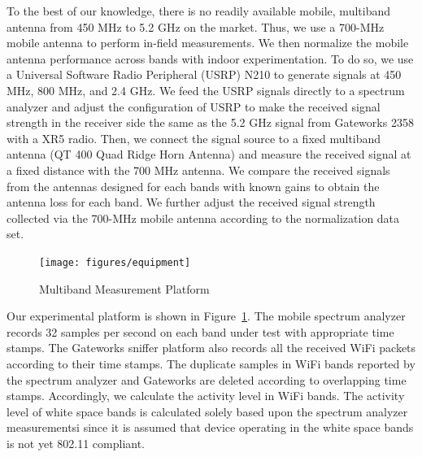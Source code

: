To the best of our knowledge, there is no readily available mobile, multiband antenna from 450 MHz to 5.2 
GHz on the market. Thus, we use a 700-MHz mobile antenna to perform in-field measurements. We then 
normalize the mobile antenna performance across bands with indoor experimentation. To do so, we use a 
Universal Software Radio Peripheral (USRP) N210 to generate signals at 450 MHz, 800 MHz, and 2.4 GHz. We 
feed the USRP signals directly to a spectrum analyzer and adjust the configuration of USRP to make the 
received signal strength in the receiver side the same as the 5.2 GHz signal from Gateworks 2358 with 
a XR5 radio. 
Then, we connect the signal source to a fixed multiband antenna (QT 400 Quad Ridge Horn Antenna) and 
measure the received signal at a fixed distance with the 700 MHz antenna. We compare the received 
signals from the antennas designed for each bands with known gains to obtain the antenna loss for 
each band. We further adjust the received signal strength collected via the 700-MHz mobile antenna 
according to the normalization data set.

  \begin{figure}
  \centering
  \texttt{[image: figures/equipment]}
  \vspace{-0.1in}
  \caption{Multiband Measurement Platform}
  \label{fig:equipment}
  \vspace{-0.3in}
  \end{figure}
  
Our experimental platform is shown in Figure~\ref{fig:equipment}. The mobile spectrum analyzer records 32 samples 
per second on each band under test with appropriate time stamps. The Gateworks sniffer platform also records all 
the received WiFi packets according to their time stamps. The duplicate samples in WiFi bands reported by the spectrum analyzer 
and Gateworks are deleted according to overlapping time stamps. Accordingly, we calculate the activity level in WiFi 
bands. The activity level of white space bands is calculated solely based upon the spectrum analyzer measurementsi 
since it is assumed that device operating in the white space bands is not yet 802.11 compliant.

